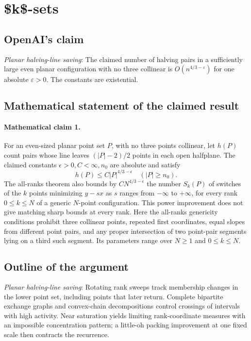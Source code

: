 \documentclass[11pt]{article}
\begin{document}
\section*{\$k\$-sets}

\subsection{OpenAI's claim}
\textit{Planar halving-line saving}: The claimed number of halving pairs in a sufficiently large even planar configuration with no three collinear is $O(n^{4/3-\varepsilon})$ for one absolute $\varepsilon>0$. The constants are existential.

\subsection{Mathematical statement of the claimed result}
\paragraph{Mathematical claim 1.} For an even-sized planar point set $P$, with no three points collinear, let $h(P)$ count pairs whose line leaves $(|P|-2)/2$ points in each open halfplane. The claimed constants $\epsilon>0,C<\infty,n_0$ are absolute and satisfy \[h(P)\le C|P|^{4/3-\epsilon}\quad(|P|\ge n_0).\] The all-ranks theorem also bounds by $CN^{4/3-\epsilon}$ the number $S_k(P)$ of switches of the $k$ points minimizing $y-sx$ as $s$ ranges from $-\infty$ to $+\infty$, for every rank $0\le k\le N$ of a generic $N$-point configuration. This power improvement does not give matching sharp bounds at every rank. Here the all-ranks genericity conditions prohibit three collinear points, repeated first coordinates, equal slopes from different point pairs, and any proper intersection of two point-pair segments lying on a third such segment. Its parameters range over $N\ge1$ and $0\le k\le N$.

\subsection{Outline of the argument}
\textit{Planar halving-line saving}: Rotating rank sweeps track membership changes in the lower point set, including points that later return. Complete bipartite exchange graphs and convex-chain decompositions control crossings of intervals with high activity. Near saturation yields limiting rank-coordinate measures with an impossible concentration pattern; a little-oh packing improvement at one fixed scale then contracts the recurrence.
\end{document}
